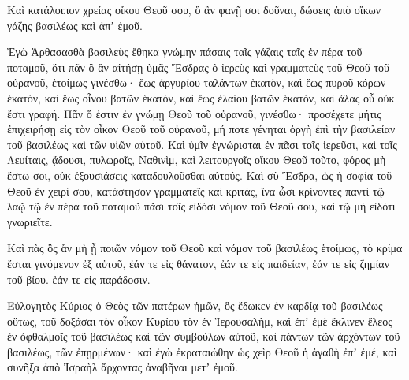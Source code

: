 {Καὶ κατάλοιπον χρείας οἴκου Θεοῦ σου, ὃ ἂν φανῇ σοι δοῦναι, δώσεις ἀπὸ οἴκων γάζης βασιλέως καὶ ἀπʼ ἐμοῦ.
\par }{\PP {}Ἐγὼ Ἀρθασασθὰ βασιλεὺς ἔθηκα γνώμην πάσαις ταῖς γάζαις ταῖς ἐν πέρα τοῦ ποταμοῦ, ὅτι πᾶν ὃ ἂν αἰτήσῃ ὑμᾶς Ἔσδρας ὁ ἱερεὺς καὶ γραμματεὺς τοῦ Θεοῦ τοῦ οὐρανοῦ, ἑτοίμως γινέσθω·
ἕως ἀργυρίου ταλάντων ἑκατὸν, καὶ ἕως πυροῦ κόρων ἑκατὸν, καὶ ἕως οἶνου βατῶν ἑκατὸν, καὶ ἕως ἐλαίου βατῶν ἑκατὸν, καὶ ἅλας οὗ οὐκ ἔστι γραφή.
Πᾶν ὅ ἐστιν ἐν γνώμῃ Θεοῦ τοῦ οὐρανοῦ, γινέσθω· προσέχετε μήτις ἐπιχειρήσῃ εἰς τὸν οἶκον Θεοῦ τοῦ οὐρανοῦ, μή ποτε γένηται ὀργὴ ἐπὶ τὴν βασιλείαν τοῦ βασιλέως καὶ τῶν υἱῶν αὐτοῦ.
Καὶ ὑμῖν ἐγνώρισται ἐν πᾶσι τοῖς ἱερεῦσι, καὶ τοῖς Λευίταις, ᾄδουσι, πυλωροῖς, Ναθινὶμ, καὶ λειτουργοῖς οἴκου Θεοῦ τοῦτο, φόρος μὴ ἔστω σοι, οὐκ ἐξουσιάσεις καταδουλοῦσθαι αὐτούς.
Καὶ σὺ Ἔσδρα, ὡς ἡ σοφία τοῦ Θεοῦ ἐν χειρί σου, κατάστησον γραμματεῖς καὶ κριτὰς, ἵνα ὦσι κρίνοντες παντὶ τῷ λαῷ τῷ ἐν πέρα τοῦ ποταμοῦ πᾶσι τοῖς εἰδόσι νόμον τοῦ Θεοῦ σου, καὶ τῷ μὴ εἰδότι γνωριεῖτε.
\par }{\PP {}Καὶ πὰς ὃς ἂν μὴ ᾖ ποιῶν νόμον τοῦ Θεοῦ καὶ νόμον τοῦ βασιλέως ἑτοίμως, τὸ κρίμα ἔσται γινόμενον ἐξ αὐτοῦ, ἐάν τε εἰς θάνατον, ἐάν τε εἰς παιδείαν, ἐάν τε εἰς ζημίαν τοῦ βίου. ἐάν τε εἰς παράδοσιν.
\par }{\PP {}Εὐλογητὸς Κύριος ὁ Θεὸς τῶν πατέρων ἡμῶν, ὃς ἔδωκεν ἐν καρδίᾳ τοῦ βασιλέως οὕτως, τοῦ δοξάσαι τὸν οἶκον Κυρίου τὸν ἐν Ἱερουσαλὴμ,
καὶ ἐπʼ ἐμὲ ἔκλινεν ἔλεος ἐν ὀφθαλμοῖς τοῦ βασιλέως καὶ τῶν συμβούλων αὐτοῦ, καὶ πάντων τῶν ἀρχόντων τοῦ βασιλέως, τῶν ἐπῃρμένων· καὶ ἐγὼ ἐκραταιώθην ὡς χεὶρ Θεοῦ ἡ ἀγαθὴ ἐπʼ ἐμέ, καὶ συνῆξα ἀπὸ Ἰσραὴλ ἄρχοντας ἀναβῆναι μετʼ ἐμοῦ.

}
